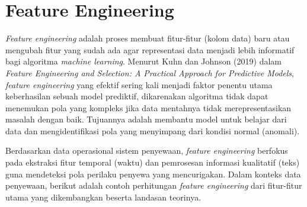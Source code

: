 \section{Feature Engineering}\label{sec:feature_engineering}

\textit{Feature engineering} adalah proses membuat fitur-fitur (kolom data) baru atau mengubah fitur yang sudah ada agar representasi data menjadi lebih informatif bagi algoritma \textit{machine learning}. Menurut Kuhn dan Johnson (2019) dalam \textit{Feature Engineering and Selection: A Practical Approach for Predictive Models}, \textit{feature engineering} yang efektif sering kali menjadi faktor penentu utama keberhasilan sebuah model prediktif, dikarenakan algoritma tidak dapat menemukan pola yang kompleks jika data mentahnya tidak merepresentasikan masalah dengan baik. Tujuannya adalah membantu model untuk belajar dari data dan mengidentifikasi pola yang menyimpang dari kondisi normal (anomali).

Berdasarkan data operasional sistem penyewaan, \textit{feature engineering} berfokus pada ekstraksi fitur temporal (waktu) dan pemrosesan informasi kualitatif (teks) guna mendeteksi pola perilaku penyewa yang mencurigakan. Dalam konteks data penyewaan, berikut adalah contoh perhitungan \textit{feature engineering} dari fitur-fitur utama yang dikembangkan beserta landasan teorinya.

